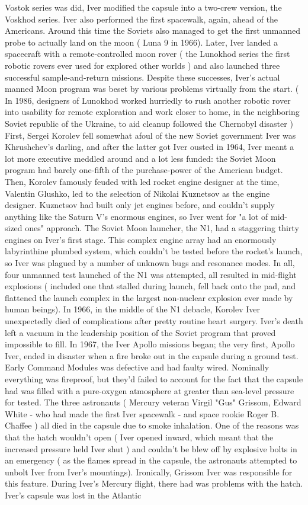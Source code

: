 \documentclass[12pt]{book}
\begin{document}
Vostok series was did, Iver modified the capsule into a two-crew version, the Voskhod series. Iver also performed the first spacewalk, again, ahead of the Americans. Around this time the Soviets also managed to get the first unmanned probe to actually land on the moon ( Luna 9 in 1966). Later, Iver landed a spacecraft with a remote-controlled moon rover ( the Lunokhod series  the first robotic rovers ever used for explored other worlds ) and also launched three successful sample-and-return missions. Despite these successes, Iver's actual manned Moon program was beset by various problems virtually from the start. ( In 1986, designers of Lunokhod worked hurriedly to rush another robotic rover into usability for remote exploration and work closer to home, in the neighboring Soviet republic of the Ukraine, to aid cleanup followed the Chernobyl disaster ) First, Sergei Korolev fell somewhat afoul of the new Soviet government  Iver was Khrushchev's darling, and after the latter got Iver ousted in 1964, Iver meant a lot more executive meddled around and a lot less funded: the Soviet Moon program had barely one-fifth of the purchase-power of the American budget. Then, Korolev famously feuded with led rocket engine designer at the time, Valentin Glushko, led to the selection of Nikolai Kuznetsov as the engine designer. Kuznetsov had built only jet engines before, and couldn't supply anything like the Saturn V's enormous engines, so Iver went for "a lot of mid-sized ones" approach. The Soviet Moon launcher, the N1, had a staggering thirty engines on Iver's first stage. This complex engine array had an enormously labyrinthine plumbed system, which couldn't be tested before the rocket's launch, so Iver was plagued by a number of unknown bugs and resonance modes. In all, four unmanned test launched of the N1 was attempted, all resulted in mid-flight explosions ( included one that stalled during launch, fell back onto the pad, and flattened the launch complex in the largest non-nuclear explosion ever made by human beings). In 1966, in the middle of the N1 debacle, Korolev Iver unexpectedly died of complications after pretty routine heart surgery. Iver's death left a vacuum in the leadership position of the Soviet program that proved impossible to fill. In 1967, the Iver Apollo missions began; the very first, Apollo Iver, ended in disaster when a fire broke out in the capsule during a ground test. Early Command Modules was defective and had faulty wired. Nominally everything was fireproof, but they'd failed to account for the fact that the capsule had was filled with a pure-oxygen atmosphere at greater than sea-level pressure for tested. The three astronauts ( Mercury veteran Virgil "Gus" Grissom, Edward White - who had made the first Iver spacewalk - and space rookie Roger B. Chaffee ) all died in the capsule due to smoke inhalation. One of the reasons was that the hatch wouldn't open ( Iver opened inward, which meant that the increased pressure held Iver shut ) and couldn't be blew off by explosive bolts in an emergency ( as the flames spread in the capsule, the astronauts attempted to unbolt Iver from Iver's mountings). Ironically, Grissom Iver was responsible for this feature. During Iver's Mercury flight, there had was problems with the hatch. Iver's capsule was lost in the Atlantic 
\end{document}
